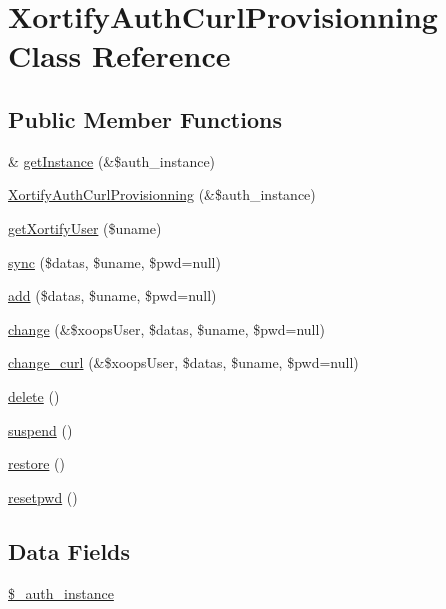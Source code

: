\hypertarget{class_xortify_auth_curl_provisionning}{\section{Xortify\-Auth\-Curl\-Provisionning Class Reference}
\label{class_xortify_auth_curl_provisionning}
}
\subsection*{Public Member Functions}
\begin{DoxyCompactItemize}
\item 
\& \hyperlink{class_xortify_auth_curl_provisionning_a2c8eaa915c70d75289ac8a03686194f9}{get\-Instance} (\&\$auth\-\_\-instance)
\item 
\hyperlink{class_xortify_auth_curl_provisionning_ae3322c493c27ac523093137bf532b541}{Xortify\-Auth\-Curl\-Provisionning} (\&\$auth\-\_\-instance)
\item 
\hyperlink{class_xortify_auth_curl_provisionning_a041d726ac26672547ed1504e8e0117aa}{get\-Xortify\-User} (\$uname)
\item 
\hyperlink{class_xortify_auth_curl_provisionning_a35dc08b0f2138eb818ff95345b73bcff}{sync} (\$datas, \$uname, \$pwd=null)
\item 
\hyperlink{class_xortify_auth_curl_provisionning_adfc9fcef01e7bd7b2f47e8e79d51fc63}{add} (\$datas, \$uname, \$pwd=null)
\item 
\hyperlink{class_xortify_auth_curl_provisionning_ae1f0971b9712c794620cf309164e43af}{change} (\&\$xoops\-User, \$datas, \$uname, \$pwd=null)
\item 
\hyperlink{class_xortify_auth_curl_provisionning_aba6f598c234d191a3b3934f90b35fd9f}{change\-\_\-curl} (\&\$xoops\-User, \$datas, \$uname, \$pwd=null)
\item 
\hyperlink{class_xortify_auth_curl_provisionning_a13bdffdd926f26b825ea57066334ff01}{delete} ()
\item 
\hyperlink{class_xortify_auth_curl_provisionning_ad73006a505121228f3b075c2409787d2}{suspend} ()
\item 
\hyperlink{class_xortify_auth_curl_provisionning_aa1371f22826cf8cde4454c9b467203d0}{restore} ()
\item 
\hyperlink{class_xortify_auth_curl_provisionning_a06d70fbd3a2db390b6f2530c0076628e}{resetpwd} ()
\end{DoxyCompactItemize}
\subsection*{Data Fields}
\begin{DoxyCompactItemize}
\item 
\hyperlink{class_xortify_auth_curl_provisionning_a486ed878bb5a7188c99ac4c9ee46ac6e}{\$\-\_\-auth\-\_\-instance}
\end{DoxyCompactItemize}


